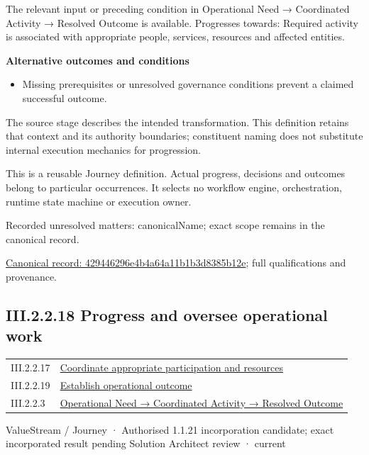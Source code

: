 The relevant input or preceding condition in Operational Need → Coordinated Activity → Resolved Outcome is available. Progresses towards: Required activity is associated with appropriate people, services, resources and affected entities.



\par\medskip\textbf{Alternative outcomes and conditions}\par


\begin{itemize}


\item Missing prerequisites or unresolved governance conditions prevent a claimed successful outcome.

\end{itemize}


The source stage describes the intended transformation. This definition retains that context and its authority boundaries; constituent naming does not substitute internal execution mechanics for progression.



This is a reusable Journey definition. Actual progress, decisions and outcomes belong to particular occurrences. It selects no workflow engine, orchestration, runtime state machine or execution owner.


{\small Recorded unresolved matters: canonicalName; exact scope remains in the canonical record.}\par
{\footnotesize \href{../../../../../../../continuum/strategy/value-stream/429446296e4b4a64a11b1b3d8385b12e.md}{Canonical record: 429446296e4b4a64a11b1b3d8385b12e}; full qualifications and provenance.}\par
\subsection*{III.2.2.18 Progress and oversee operational work}
\label{navigation:III.2.2.18}

\begin{longtable}{p{.22\linewidth}p{.73\linewidth}}
III.2.2.17 & \hyperref[element:429446296e4b4a64a11b1b3d8385b12e]{Coordinate appropriate participation and resources} \\
III.2.2.19 & \hyperref[element:79f756815e3645eb82a150870dc12502]{Establish operational outcome} \\
III.2.2.3 & \hyperref[element:beea615ca7b34bbcbd0ad3a2a6ab2cff]{Operational Need → Coordinated Activity → Resolved Outcome} \\
\end{longtable}
\label{element:b404dffef05e4f2bb9d414e4d1ed33af}
{\small ValueStream / Journey · Authorised 1.1.21 incorporation candidate; exact incorporated result pending Solution Architect review · current}\par

